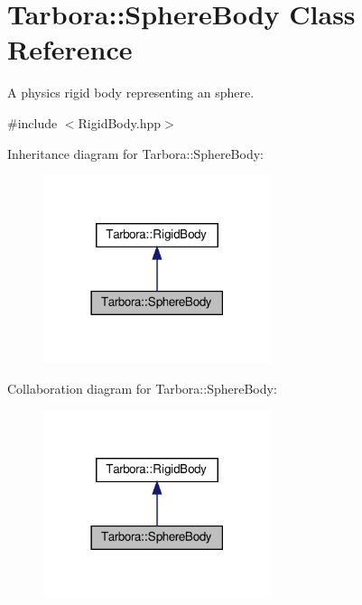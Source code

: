\hypertarget{classTarbora_1_1SphereBody}{}\section{Tarbora\+:\+:Sphere\+Body Class Reference}
\label{classTarbora_1_1SphereBody}


A physics rigid body representing an sphere.  




{\ttfamily \#include $<$Rigid\+Body.\+hpp$>$}



Inheritance diagram for Tarbora\+:\+:Sphere\+Body\+:
\nopagebreak
\begin{figure}[H]
\begin{center}
\leavevmode
\includegraphics[width=189pt]{classTarbora_1_1SphereBody__inherit__graph}
\end{center}
\end{figure}


Collaboration diagram for Tarbora\+:\+:Sphere\+Body\+:
\nopagebreak
\begin{figure}[H]
\begin{center}
\leavevmode
\includegraphics[width=189pt]{classTarbora_1_1SphereBody__coll__graph}
\end{center}
\end{figure}
